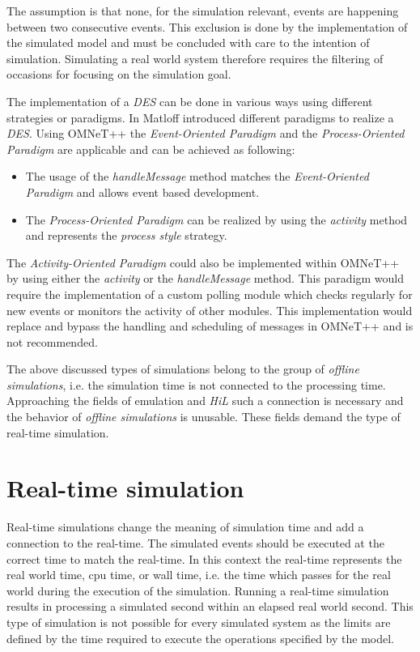The assumption is that none, for the simulation relevant, events are happening between two consecutive events.
This exclusion is done by the implementation of the simulated model and must be concluded with care to the intention of simulation.
Simulating a real world system therefore requires the filtering of occasions for focusing on the simulation goal. \cite[section 4.1.1]{omnet_manual}

The implementation of a \emph{DES} can be done in various ways using different strategies or paradigms.
In \cite[chapter 2]{matloff_introduction_2008} Matloff introduced different paradigms to realize a \emph{DES}.
Using OMNeT++ the \emph{Event-Oriented Paradigm} and the \emph{Process-Oriented Paradigm} are applicable and can be achieved as following:

\begin{itemize}
    \item The usage of the \emph{handleMessage} method matches the \emph{Event-Oriented Paradigm} and allows event based development.
    \item The \emph{Process-Oriented Paradigm} can be realized by using the \emph{activity} method and represents the \emph{process style} strategy.
\end{itemize}

\begin{sloppypar}
The \emph{Activity-Oriented Paradigm} could also be implemented within OMNeT++ by using either the \emph{activity} or the \emph{handleMessage} method.
This paradigm would require the implementation of a custom polling module which checks regularly for new events or monitors the activity of other modules.
This implementation would replace and bypass the handling and scheduling of messages in OMNeT++ and is not recommended. \cite[chapter 2.1]{matloff_introduction_2008}
\\
\end{sloppypar}

The above discussed types of simulations belong to the group of \emph{offline simulations}, i.e. the simulation time is not connected to the processing time.
Approaching the fields of emulation and \emph{HiL} such a connection is necessary and the behavior of \emph{offline simulations} is unusable.
These fields demand the type of real-time simulation.  \cite[section III.B]{belanger_what_2010}

\section{Real-time simulation}
\label{sec:simulation_real_time}
Real-time simulations change the meaning of simulation time and add a connection to the real-time.
The simulated events should be executed at the correct time to match the real-time.
In this context the real-time represents the real world time, cpu time, or wall time, i.e. the time which passes for the real world during the execution of the simulation.
Running a real-time simulation results in processing a simulated second within an elapsed real world second.
This type of simulation is not possible for every simulated system as the limits are defined by the time required to execute the operations specified by the model.


